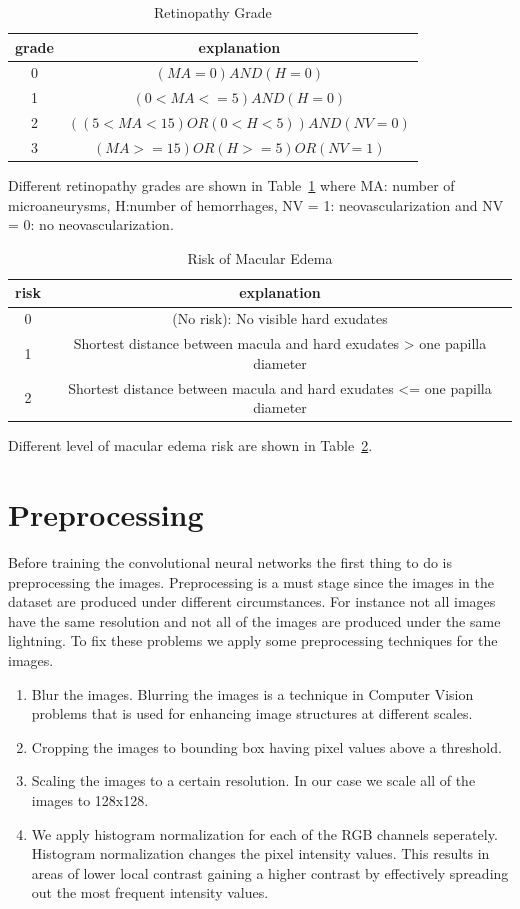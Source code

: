 \begin{table}[t]
\centering
\caption{Retinopathy Grade} \label{tab:rg}
\begin{tabular}{|c|c|} \hline
grade & explanation \\ \hline
0 & $(MA = 0) AND (H = 0)$ \\ \hline
1 & $(0 < MA <= 5) AND (H = 0)$\\\hline
2 & $((5 < MA < 15) OR (0 < H < 5)) AND (NV = 0)$ \\\hline
3 & $(MA >= 15) OR (H >=5) OR (NV = 1)$\\\hline
\end{tabular}
\end{table}

Different retinopathy grades are shown in Table~\ref{tab:rg} where MA: number of microaneurysms, H:number of hemorrhages, NV = 1: neovascularization and NV = 0: no neovascularization. 

\begin{table}[t]
\centering
\caption{Risk of Macular Edema} \label{tab:ma}
\begin{tabular}{|c|c|} \hline
risk & explanation \\ \hline
0 & (No risk): No visible hard exudates \\ \hline
1 & Shortest distance between macula and hard exudates > one papilla diameter\\\hline
2 & Shortest distance between macula and hard exudates <= one papilla diameter \\\hline
\end{tabular}
\end{table}

Different level of macular edema risk are shown in Table~\ref{tab:ma}.

\section{Preprocessing}
Before training the convolutional neural networks the first thing to do is preprocessing the images. Preprocessing is a must stage since the images in the dataset are produced under different circumstances. For instance not all images have the same resolution and not all of the images are produced under the same lightning. To fix these problems we apply some preprocessing techniques for the images. 

\begin{enumerate}
    \item Blur the images. Blurring the images is a technique in Computer Vision problems that is used for enhancing image structures at different scales.
    \item Cropping the images to bounding box having pixel values above a threshold.
    \item Scaling the images to a certain resolution. In our case we scale all of the images to 128x128.
    \item We apply histogram normalization for each of the RGB channels seperately. Histogram normalization changes the pixel intensity values. This results in areas of lower local contrast gaining a higher contrast by effectively spreading out the most frequent intensity values.
\end{enumerate}

